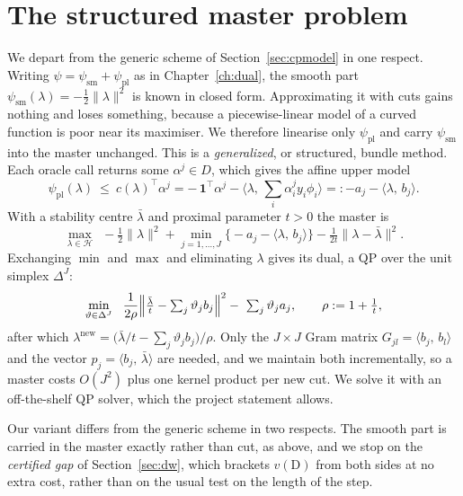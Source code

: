 \documentclass[11pt,a4paper]{report}
\newcommand{\Hs}{\mathcal{H}}
\newcommand{\one}{\mathbf{1}}
\newcommand{\inner}[2]{\langle #1,\, #2 \rangle}
\begin{document}
\section{The structured master problem}
\label{sec:master}
We depart from the generic scheme of Section~\ref{sec:cpmodel} in one respect.
Writing $\psi=\psi_{\mathrm{sm}}+\psi_{\mathrm{pl}}$ as in Chapter~\ref{ch:dual},
the smooth part $\psi_{\mathrm{sm}}(\lambda)=-\tfrac12\|\lambda\|^2$ is known in
closed form. Approximating it with cuts gains nothing and loses something, because a
piecewise-linear model of a curved function is poor near its maximiser. We therefore
linearise only $\psi_{\mathrm{pl}}$ and carry $\psi_{\mathrm{sm}}$ into the master
unchanged. This is a \emph{generalized}, or structured, bundle method. Each oracle call
returns some $\alpha^j\in D$, which gives the affine upper model
\[
\psi_{\mathrm{pl}}(\lambda)\ \le\ c(\lambda)^{\!\top}\alpha^j
= -\,\one^{\!\top}\alpha^j-\inner{\lambda}{\textstyle\sum_i\alpha^j_iy_i\phi_i}
=: -a_j-\inner{\lambda}{b_j} .
\]
With a stability centre $\bar\lambda$ and proximal parameter $t>0$ the master is
\begin{equation}
\label{eq:master}
\max_{\lambda\in\Hs}\ \
-\tfrac12\|\lambda\|^2
+\min_{j=1,\dots,J}\bigl\{-a_j-\inner{\lambda}{b_j}\bigr\}
-\tfrac{1}{2t}\|\lambda-\bar\lambda\|^2 .
\end{equation}
Exchanging $\min$ and $\max$ and eliminating $\lambda$ gives its dual, a QP over the
unit simplex $\Delta^J$:
\begin{equation}
\label{eq:masterdual}
\min_{\vartheta\in\Delta^J}\ \
\frac{1}{2\rho}\Bigl\|\tfrac{\bar\lambda}{t}-\textstyle\sum_j\vartheta_jb_j\Bigr\|^2
-\ \textstyle\sum_j\vartheta_j a_j ,
\qquad \rho:=1+\tfrac1t,
\end{equation}
after which
$\lambda^{\mathrm{new}}=\bigl(\bar\lambda/t-\sum_j\vartheta_jb_j\bigr)/\rho$. Only
the $J\times J$ Gram matrix $G_{jl}=\inner{b_j}{b_l}$ and the vector
$p_j=\inner{b_j}{\bar\lambda}$ are needed, and we maintain both incrementally, so a
master costs $O(J^2)$ plus one kernel product per new cut. We solve it with an
off-the-shelf QP solver, which the project statement allows.

Our variant differs from the generic scheme in two respects. The smooth part is
carried in the master exactly rather than cut, as above, and we stop on the
\emph{certified gap} of Section~\ref{sec:dw}, which brackets $v(\mathrm{D})$ from
both sides at no extra cost, rather than on the usual test on the length of the
step.
\end{document}
